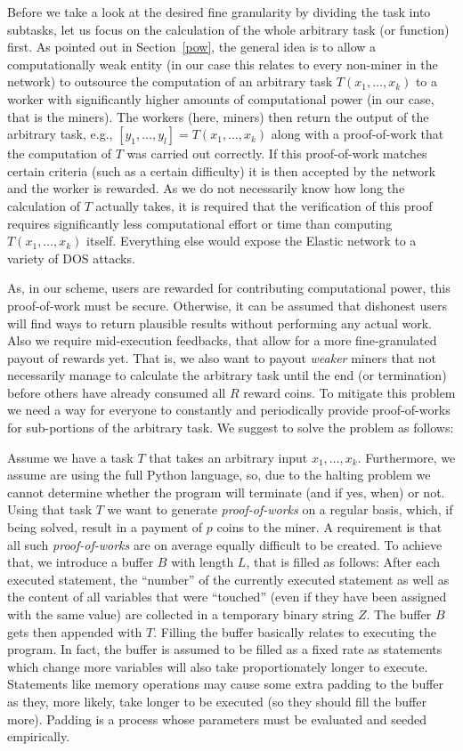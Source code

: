 \documentclass{sig-alternate}
\begin{document}
Before we take a look at the desired fine granularity by dividing the task into subtasks, let us focus on the calculation of the whole arbitrary task (or function) first.
As pointed out in Section~\ref{pow}, the general idea is to allow a computationally weak entity (in our case this relates to every non-miner in the network) to outsource the computation of an arbitrary task $T(x_1,\ldots,x_k)$ to a worker with significantly higher amounts of computational power (in our case, that is the miners).
The workers (here, miners) then return the output of the arbitrary task, e.g., $[y_1,\ldots,y_l] = T(x_1,\ldots,x_k)$ along with a proof-of-work that the computation of $T$ was carried out correctly.
If this proof-of-work matches certain criteria (such as a certain difficulty) it is then accepted by the network and the worker is rewarded.
As we do not necessarily know how long the calculation of $T$ actually takes, it is required that the verification of this proof requires significantly less computational effort or time than
computing $T(x_1,\ldots,x_k)$ itself. Everything else would expose the Elastic network to a variety of DOS attacks.

As, in our scheme, users are rewarded for contributing computational power, this proof-of-work must be secure. Otherwise, it can be assumed that dishonest users will find ways to return plausible results without performing any actual work. 
Also we require mid-execution feedbacks, that allow for a more fine-granulated payout of rewards yet. That is, we also want to payout \emph{weaker} miners that not necessarily manage to calculate the arbitrary task until the end (or termination) before others have already consumed all $R$ reward coins. To mitigate this problem we need a way for everyone to constantly and periodically provide proof-of-works for sub-portions of the arbitrary task.
We suggest to solve the problem as follows: 

Assume we have a task $T$ that takes an arbitrary input $x_1,\ldots,x_k$. Furthermore, we assume are using the full Python language, so, due to the halting problem we cannot determine whether the program will terminate (and if yes, when) or not.
Using that task $T$ we want to generate \emph{proof-of-works} on a regular basis, which, if being solved, result in a payment of $p$ coins to the miner. A requirement is that all such \emph{proof-of-works} are on average equally difficult to be created.
To achieve that, we introduce a buffer $B$ with length $L$, that is filled as follows:
After each executed statement, the ``number'' of the currently executed statement as well as the content of all variables that were ``touched'' (even if they have been assigned with the same value) are collected in a temporary binary string $Z$. The buffer $B$ gets then appended with $T$.
Filling the buffer basically relates to executing the program. In fact, the buffer is assumed to be filled as a fixed rate as statements which change more variables will also take proportionately longer to execute. Statements like memory operations may cause some extra padding to the buffer as they, more likely, take longer to be executed (so they should fill the buffer more). Padding is a process whose parameters must be evaluated and seeded empirically.
\end{document}
